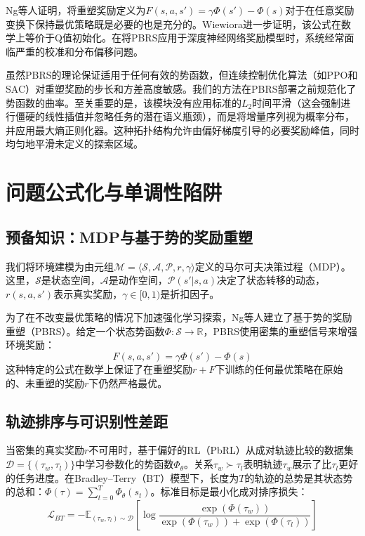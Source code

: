 Ng等人\cite{ng1999}证明，将重塑奖励定义为$F(s, a, s') = \gamma\Phi(s') - \Phi(s)$对于在任意奖励变换下保持最优策略既是必要的也是充分的。Wiewiora\cite{wiewiora2003}进一步证明，该公式在数学上等价于Q值初始化。在将PBRS应用于深度神经网络奖励模型时，系统经常面临严重的校准和分布偏移问题。

虽然PBRS的理论保证适用于任何有效的势函数，但连续控制优化算法（如PPO\cite{schulman2017}和SAC\cite{haarnoja2018}）对重塑奖励的步长和方差高度敏感。我们的方法在PBRS部署之前规范化了势函数的曲率。至关重要的是，该模块没有应用标准的$L_2$时间平滑（这会强制进行僵硬的线性插值并忽略任务的潜在语义瓶颈），而是将增量序列视为概率分布，并应用最大熵正则化器\cite{shannon1948,jaynes1957}。这种拓扑结构允许由偏好梯度引导的必要奖励峰值，同时均匀地平滑未定义的探索区域。



\clearpage
\section{问题公式化与单调性陷阱}

\subsection{预备知识：MDP与基于势的奖励重塑}

我们将环境建模为由元组$\mathcal{M} = \langle \mathcal{S}, \mathcal{A}, \mathcal{P}, r, \gamma \rangle$定义的马尔可夫决策过程（MDP）\cite{sutton2018}。这里，$\mathcal{S}$是状态空间，$\mathcal{A}$是动作空间，$\mathcal{P}(s'|s,a)$决定了状态转移的动态，$r(s,a,s')$表示真实奖励，$\gamma \in [0, 1)$是折扣因子。

为了在不改变最优策略的情况下加速强化学习探索，Ng等人\cite{ng1999}建立了基于势的奖励重塑（PBRS）。给定一个状态势函数$\Phi: \mathcal{S} \to \mathbb{R}$，PBRS使用密集的重塑信号来增强环境奖励：
\begin{equation}
\label{eq:pbrs}
    F(s, a, s') = \gamma \Phi(s') - \Phi(s)
\end{equation}
这种特定的公式在数学上保证了在重塑奖励$r + F$下训练的任何最优策略在原始的、未重塑的奖励$r$下仍然严格最优。

\subsection{轨迹排序与可识别性差距}

当密集的真实奖励$r$不可用时，基于偏好的RL（PbRL）从成对轨迹比较的数据集$\mathcal{D} = \{(\tau_w, \tau_l)\}$中学习参数化的势函数$\Phi_\theta$。关系$\tau_w \succ \tau_l$表明轨迹$\tau_w$展示了比$\tau_l$更好的任务进度。在Bradley--Terry（BT）模型\cite{bradley1952}下，长度为$T$的轨迹的总势是其状态势的总和：$\Phi(\tau) = \sum_{t=0}^T \Phi_\theta(s_t)$。标准目标是最小化成对排序损失：
\begin{equation}
\label{eq:bt}
    \mathcal{L}_{BT} = - \mathbb{E}_{(\tau_w, \tau_l) \sim \mathcal{D}} \left[ \log \frac{\exp(\Phi(\tau_w))}{\exp(\Phi(\tau_w)) + \exp(\Phi(\tau_l))} \right]
\end{equation}

